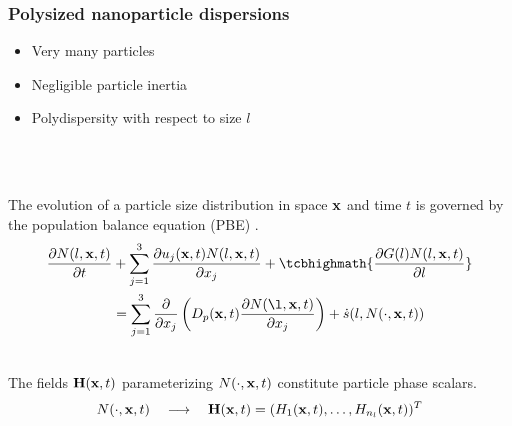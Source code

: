 \documentclass[10pt,xcolor=dvipsnames]{beamer}
\newcommand*{\itemskip}{0.25\baselineskip}
\renewcommand{\cite}{\parencite}
\begin{document}
\begin{frame}[t]
  
  \frametitle{Polysized nanoparticle dispersions}
  
  \vspace{-0.5\baselineskip}
  \begin{minipage}[t]{0.6\columnwidth}\vskip0pt
  \justifying{}
  \begin{itemize}
  \item Very many particles
  \vspace{\itemskip}
  \item Negligible particle inertia
  \vspace{\itemskip}
  \item Polydispersity with respect to size $l$
  \end{itemize}
  \end{minipage}\hfill
  \begin{minipage}[t]{0.38\columnwidth}\vskip0pt
  \resizebox{\columnwidth}{!}{}
  \end{minipage}\\
  \vspace{0.5\baselineskip}
  
  \\
  \justifying The evolution of a particle size distribution in space ${\mathbf x}$ and time $t$ is governed by the population balance equation (PBE) \cite{Hulburt1964}.
  \begin{equation*}
  \begin{split}
    \frac{\partial N(l, \xbf, t)}{\partial t} &+ \sum_{j = 1}^{3} \frac{\partial u_j(\xbf, t) N(l, \xbf, t)}{\partial x_j} 
    + \tcbhighmath{\frac{\partial G(l) N(l, \xbf, t)}{\partial l}} \\
    &= \sum_{j = 1}^{3} \frac{\partial}{\partial x_j}\left(D_p(\xbf, t) \frac{\partial N(\l, \xbf, t)}{\partial x_j}\right) + \dot{s}(l, N(\cdot, \xbf, t))
  \label{eq:pbe}
  \end{split}
  \end{equation*}
  
  \\
  \justifying The fields ${\mathbf H}({\mathbf x}, t)$ parameterizing $N(\cdot, {\mathbf x}, t)$ constitute particle phase scalars.
  \begin{equation*}
    N(\cdot, {\mathbf x}, t) \quad\longrightarrow\quad {\mathbf H}({\mathbf x}, t) = (H_1({\mathbf x}, t), \ldots, H_{n_l}({\mathbf x}, t))^T
  \end{equation*}

\end{frame}
\end{document}
